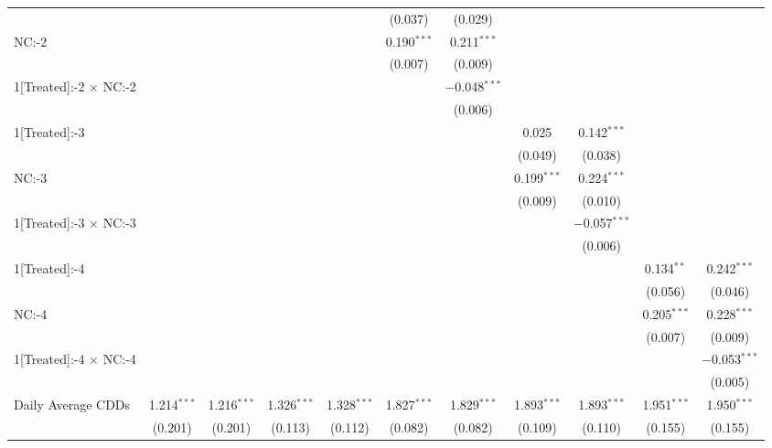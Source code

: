 \begin{table}[!htbp]
\begin{adjustbox}{scale = 0.75}
\begin{tabular}{@{\extracolsep{5pt}}lcccccccccc}
  &  &  &  &  & (0.037) & (0.029) &  &  &  &  \\ 
 NC:-2 &  &  &  &  & 0.190$^{***}$ & 0.211$^{***}$ &  &  &  &  \\ 
  &  &  &  &  & (0.007) & (0.009) &  &  &  &  \\ 
 1[Treated]:-2 $\times$ NC:-2 &  &  &  &  &  & $-$0.048$^{***}$ &  &  &  &  \\ 
  &  &  &  &  &  & (0.006) &  &  &  &  \\ 
 1[Treated]:-3 &  &  &  &  &  &  & 0.025 & 0.142$^{***}$ &  &  \\ 
  &  &  &  &  &  &  & (0.049) & (0.038) &  &  \\ 
 NC:-3 &  &  &  &  &  &  & 0.199$^{***}$ & 0.224$^{***}$ &  &  \\ 
  &  &  &  &  &  &  & (0.009) & (0.010) &  &  \\ 
 1[Treated]:-3 $\times$ NC:-3 &  &  &  &  &  &  &  & $-$0.057$^{***}$ &  &  \\ 
  &  &  &  &  &  &  &  & (0.006) &  &  \\ 
 1[Treated]:-4 &  &  &  &  &  &  &  &  & 0.134$^{**}$ & 0.242$^{***}$ \\ 
  &  &  &  &  &  &  &  &  & (0.056) & (0.046) \\ 
 NC:-4 &  &  &  &  &  &  &  &  & 0.205$^{***}$ & 0.228$^{***}$ \\ 
  &  &  &  &  &  &  &  &  & (0.007) & (0.009) \\ 
 1[Treated]:-4 $\times$ NC:-4 &  &  &  &  &  &  &  &  &  & $-$0.053$^{***}$ \\ 
  &  &  &  &  &  &  &  &  &  & (0.005) \\ 
 Daily Average CDDs & 1.214$^{***}$ & 1.216$^{***}$ & 1.326$^{***}$ & 1.328$^{***}$ & 1.827$^{***}$ & 1.829$^{***}$ & 1.893$^{***}$ & 1.893$^{***}$ & 1.951$^{***}$ & 1.950$^{***}$ \\ 
  & (0.201) & (0.201) & (0.113) & (0.112) & (0.082) & (0.082) & (0.109) & (0.110) & (0.155) & (0.155) \\ 

\end{tabular}
\end{adjustbox}
\end{table}
